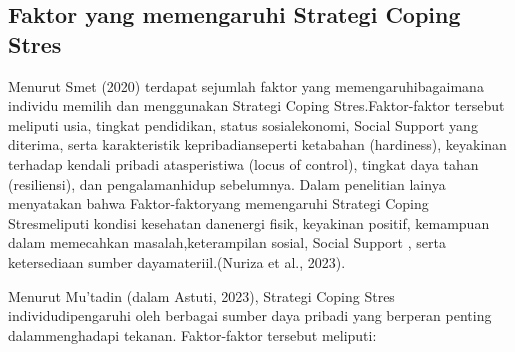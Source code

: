 \documentclass[../manperil.tex]{subfiles}
\begin{document}
\subsection{Faktor yang memengaruhi Strategi Coping Stres}%
\label{sub:faktor_yang_memengaruhi_strategi_coping_stres}

Menurut Smet (2020) terdapat sejumlah faktor yang memengaruhibagaimana individu memilih dan menggunakan Strategi Coping Stres.Faktor-faktor tersebut meliputi usia, tingkat pendidikan, status sosialekonomi, Social Support yang diterima, serta karakteristik kepribadianseperti ketabahan (hardiness), keyakinan terhadap kendali pribadi atasperistiwa (locus of control), tingkat daya tahan (resiliensi), dan pengalamanhidup sebelumnya. Dalam penelitian lainya menyatakan bahwa Faktor-faktoryang memengaruhi Strategi Coping Stresmeliputi kondisi kesehatan danenergi fisik, keyakinan positif, kemampuan dalam memecahkan masalah,keterampilan sosial, Social Support , serta ketersediaan sumber dayamateriil.(Nuriza et al., 2023).

Menurut Mu’tadin (dalam Astuti, 2023), Strategi Coping Stres individudipengaruhi oleh berbagai sumber daya pribadi yang berperan penting dalammenghadapi tekanan. Faktor-faktor tersebut meliputi:
\end{document}
